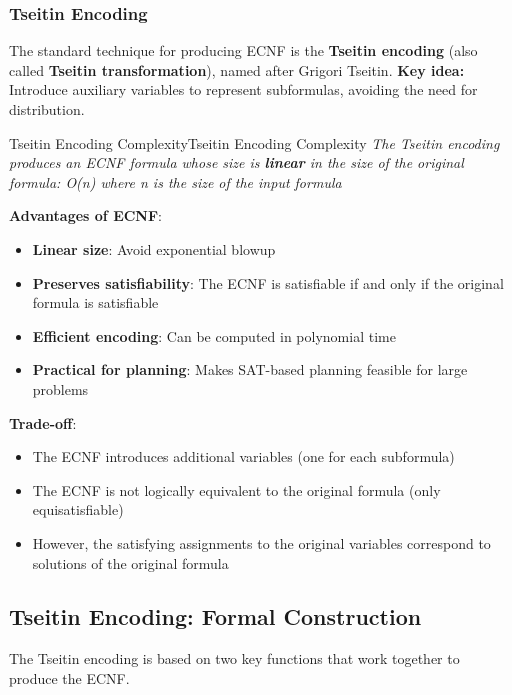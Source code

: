 \documentclass[a4paper]{article}
\theoremstyle{definition}
\begin{document}
\subsubsection{Tseitin Encoding}
The standard technique for producing ECNF is the \textbf{Tseitin encoding} (also called \textbf{Tseitin transformation}),
named after Grigori Tseitin.
\vspace{1em}
\noindent
\newline
\textbf{Key idea:} Introduce auxiliary variables to represent subformulas, avoiding the need for distribution.
\begin{theorem}{Tseitin Encoding Complexity}{Tseitin Encoding Complexity}
\textit{The Tseitin encoding produces an ECNF formula whose size is \textbf{linear} in the size of the original formula: 
O(n) where n is the size of the input formula}
\end{theorem}
\textbf{Advantages of ECNF}:
\begin{itemize}
    \item \textbf{Linear size}: Avoid exponential blowup 
    \item \textbf{Preserves satisfiability}: The ECNF is satisfiable if and only if the original formula is satisfiable 
    \item \textbf{Efficient encoding}: Can be computed in polynomial time 
    \item \textbf{Practical for planning}: Makes SAT-based planning feasible for large problems
\end{itemize}
\textbf{Trade-off}:
\begin{itemize}
    \item The ECNF introduces additional variables (one for each subformula)
    \item The ECNF is not logically equivalent to the original formula (only equisatisfiable)
    \item However, the satisfying assignments to the original variables correspond to solutions of the original formula
\end{itemize}
\subsection{Tseitin Encoding: Formal Construction}
The Tseitin encoding is based on two key functions that work together to produce the ECNF.
\end{document}

